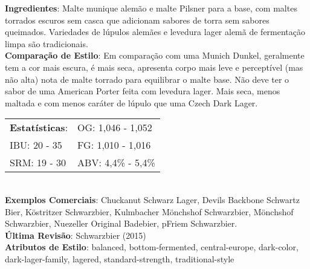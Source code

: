 \textbf{Ingredientes}: Malte munique alemão e malte Pilsner para a base, com maltes torrados escuros sem casca que adicionam sabores de torra sem sabores queimados. Variedades de lúpulos alemães e levedura lager alemã de fermentação limpa são tradicionais. \\
\textbf{Comparação de Estilo}: Em comparação com uma Munich Dunkel, geralmente tem a cor mais escura, é mais seca, apresenta corpo mais leve e perceptível (mas não alta) nota de malte torrado para equilibrar o malte base. Não deve ter o sabor de uma American Porter feita com levedura lager. Mais seca, menos maltada e com menos caráter de lúpulo que uma Czech Dark Lager. \\
\begin{tabular}{@{}p{35mm}p{35mm}@{}}
  \textbf{Estatísticas}: & OG: 1,046 - 1,052 \\
  IBU: 20 - 35 & FG: 1,010 - 1,016 \\
  SRM: 19 - 30 & ABV: 4,4\% - 5,4\%
\end{tabular}\\
\textbf{Exemplos Comerciais}: Chuckanut Schwarz Lager, Devils Backbone Schwartz Bier, Köstritzer Schwarzbier, Kulmbacher Mönchshof Schwarzbier, Mönchshof Schwarzbier, Nuezeller Original Badebier, pFriem Schwarzbier. \\
\textbf{Última Revisão}: Schwarzbier (2015) \\
\textbf{Atributos de Estilo}: balanced, bottom-fermented, central-europe, dark-color, dark-lager-family, lagered, standard-strength, traditional-style
